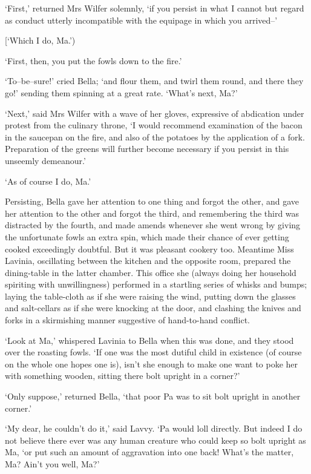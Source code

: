 ‘First,’ returned Mrs Wilfer solemnly, ‘if you persist in what I cannot
but regard as conduct utterly incompatible with the equipage in which
you arrived--’

[‘Which I do, Ma.’)

‘First, then, you put the fowls down to the fire.’

‘To--be--sure!’ cried Bella; ‘and flour them, and twirl them round, and
there they go!’ sending them spinning at a great rate. ‘What’s next,
Ma?’

‘Next,’ said Mrs Wilfer with a wave of her gloves, expressive of
abdication under protest from the culinary throne, ‘I would recommend
examination of the bacon in the saucepan on the fire, and also of the
potatoes by the application of a fork. Preparation of the greens will
further become necessary if you persist in this unseemly demeanour.’

‘As of course I do, Ma.’

Persisting, Bella gave her attention to one thing and forgot the
other, and gave her attention to the other and forgot the third, and
remembering the third was distracted by the fourth, and made amends
whenever she went wrong by giving the unfortunate fowls an extra spin,
which made their chance of ever getting cooked exceedingly doubtful. But
it was pleasant cookery too. Meantime Miss Lavinia, oscillating between
the kitchen and the opposite room, prepared the dining-table in the
latter chamber. This office she (always doing her household spiriting
with unwillingness) performed in a startling series of whisks and bumps;
laying the table-cloth as if she were raising the wind, putting down
the glasses and salt-cellars as if she were knocking at the door, and
clashing the knives and forks in a skirmishing manner suggestive of
hand-to-hand conflict.

‘Look at Ma,’ whispered Lavinia to Bella when this was done, and they
stood over the roasting fowls. ‘If one was the most dutiful child in
existence (of course on the whole one hopes one is), isn’t she enough
to make one want to poke her with something wooden, sitting there bolt
upright in a corner?’

‘Only suppose,’ returned Bella, ‘that poor Pa was to sit bolt upright in
another corner.’

‘My dear, he couldn’t do it,’ said Lavvy. ‘Pa would loll directly. But
indeed I do not believe there ever was any human creature who could keep
so bolt upright as Ma, ‘or put such an amount of aggravation into one
back! What’s the matter, Ma? Ain’t you well, Ma?’

